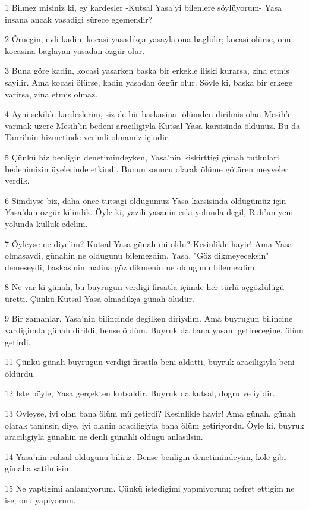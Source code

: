 \par 1 Bilmez misiniz ki, ey kardesler -Kutsal Yasa'yi bilenlere söylüyorum- Yasa insana ancak yasadigi sürece egemendir?
\par 2 Örnegin, evli kadin, kocasi yasadikça yasayla ona baglidir; kocasi ölürse, onu kocasina baglayan yasadan özgür olur.
\par 3 Buna göre kadin, kocasi yasarken baska bir erkekle iliski kurarsa, zina etmis sayilir. Ama kocasi ölürse, kadin yasadan özgür olur. Söyle ki, baska bir erkege varirsa, zina etmis olmaz.
\par 4 Ayni sekilde kardeslerim, siz de bir baskasina -ölümden dirilmis olan Mesih'e- varmak üzere Mesih'in bedeni araciligiyla Kutsal Yasa karsisinda öldünüz. Bu da Tanri'nin hizmetinde verimli olmamiz içindir.
\par 5 Çünkü biz benligin denetimindeyken, Yasa'nin kiskirttigi günah tutkulari bedenimizin üyelerinde etkindi. Bunun sonucu olarak ölüme götüren meyveler verdik.
\par 6 Simdiyse biz, daha önce tutsagi oldugumuz Yasa karsisinda öldügümüz için Yasa'dan özgür kilindik. Öyle ki, yazili yasanin eski yolunda degil, Ruh'un yeni yolunda kulluk edelim.
\par 7 Öyleyse ne diyelim? Kutsal Yasa günah mi oldu? Kesinlikle hayir! Ama Yasa olmasaydi, günahin ne oldugunu bilemezdim. Yasa, "Göz dikmeyeceksin" demeseydi, baskasinin malina göz dikmenin ne oldugunu bilemezdim.
\par 8 Ne var ki günah, bu buyrugun verdigi firsatla içimde her türlü açgözlülügü üretti. Çünkü Kutsal Yasa olmadikça günah ölüdür.
\par 9 Bir zamanlar, Yasa'nin bilincinde degilken diriydim. Ama buyrugun bilincine vardigimda günah dirildi, bense öldüm. Buyruk da bana yasam getirecegine, ölüm getirdi.
\par 11 Çünkü günah buyrugun verdigi firsatla beni aldatti, buyruk araciligiyla beni öldürdü.
\par 12 Iste böyle, Yasa gerçekten kutsaldir. Buyruk da kutsal, dogru ve iyidir.
\par 13 Öyleyse, iyi olan bana ölüm mü getirdi? Kesinlikle hayir! Ama günah, günah olarak taninsin diye, iyi olanin araciligiyla bana ölüm getiriyordu. Öyle ki, buyruk araciligiyla günahin ne denli günahli oldugu anlasilsin.
\par 14 Yasa'nin ruhsal oldugunu biliriz. Bense benligin denetimindeyim, köle gibi günaha satilmisim.
\par 15 Ne yaptigimi anlamiyorum. Çünkü istedigimi yapmiyorum; nefret ettigim ne ise, onu yapiyorum.
